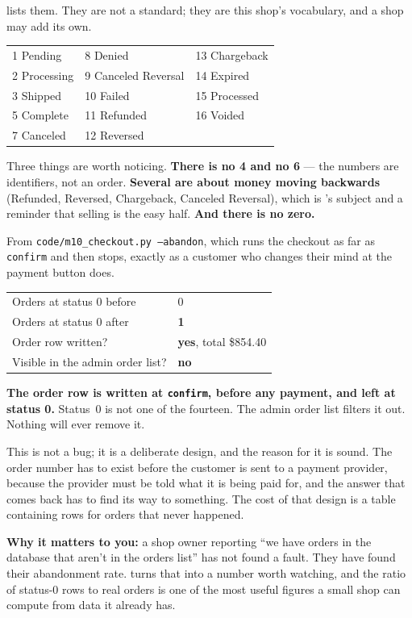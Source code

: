 \begin{examplebox}
 lists them. They are not a
standard; they are this shop's vocabulary, and a shop may add its own.

\smallskip
\begin{tabular}{@{}L{4.4cm}L{4.4cm}L{4.4cm}@{}}
1 Pending & 8 Denied & 13 Chargeback \\
2 Processing & 9 Canceled Reversal & 14 Expired \\
3 Shipped & 10 Failed & 15 Processed \\
5 Complete & 11 Refunded & 16 Voided \\
7 Canceled & 12 Reversed & \\
\end{tabular}

\smallskip
Three things are worth noticing. \textbf{There is no 4 and no 6} --- the
numbers are identifiers, not an order. \textbf{Several are about money moving
backwards} (Refunded, Reversed, Chargeback, Canceled Reversal), which is
's subject and a reminder that selling is the easy half.
\textbf{And there is no zero.}
\end{examplebox}

\begin{measured}
From \texttt{code/m10\_checkout.py --abandon}, which runs the checkout as far
as \texttt{confirm} and then stops, exactly as a customer who changes their
mind at the payment button does.

\smallskip
\begin{tabular}{@{}L{6.6cm}L{6.6cm}@{}}
Orders at status 0 before & 0 \\
Orders at status 0 after & \textbf{1} \\
Order row written? & \textbf{yes}, total \$854.40 \\
Visible in the admin order list? & \textbf{no} \\
\end{tabular}

\smallskip
\textbf{The order row is written at \texttt{confirm}, before any payment, and
left at status 0.} Status~0 is not one of the fourteen. The admin order list
filters it out. Nothing will ever remove it.

\smallskip
This is not a bug; it is a deliberate design, and the reason for it is sound.
The order number has to exist before the customer is sent to a payment
provider, because the provider must be told what it is being paid for, and the
answer that comes back has to find its way to something. The cost of that
design is a table containing rows for orders that never happened.

\smallskip
\textbf{Why it matters to you:} a shop owner reporting ``we have orders in the
database that aren't in the orders list'' has not found a fault. They have
found their abandonment rate.  turns that into a number worth
watching, and the ratio of status-0 rows to real orders is one of the most
useful figures a small shop can compute from data it already has.
\end{measured}

